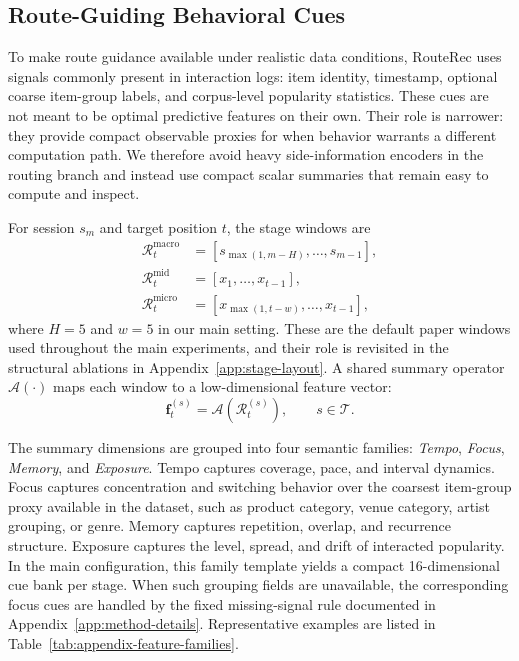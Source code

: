 \documentclass[sigconf,review,anonymous]{acmart}
\begin{document}
\subsection{Route-Guiding Behavioral Cues}
\label{sec:feature-construction}

To make route guidance available under realistic data conditions, RouteRec uses signals commonly present in interaction logs: item identity, timestamp, optional coarse item-group labels, and corpus-level popularity statistics. These cues are not meant to be optimal predictive features on their own. Their role is narrower: they provide compact observable proxies for when behavior warrants a different computation path. We therefore avoid heavy side-information encoders in the routing branch and instead use compact scalar summaries that remain easy to compute and inspect.

For session $s_m$ and target position $t$, the stage windows are
\begin{align}
\mathcal{R}^{\mathrm{macro}}_t &= [s_{\max(1,m-H)},\dots,s_{m-1}], \\
\mathcal{R}^{\mathrm{mid}}_t &= [x_1,\dots,x_{t-1}], \\
\mathcal{R}^{\mathrm{micro}}_t &= [x_{\max(1,t-w)},\dots,x_{t-1}],
\end{align}
where $H=5$ and $w=5$ in our main setting. These are the default paper windows used throughout the main experiments, and their role is revisited in the structural ablations in Appendix~\ref{app:stage-layout}. A shared summary operator $\mathcal{A}(\cdot)$ maps each window to a low-dimensional feature vector:
\[
\mathbf{f}^{(s)}_t=\mathcal{A}(\mathcal{R}^{(s)}_t),\qquad s\in\mathcal{T}.
\]

The summary dimensions are grouped into four semantic families: \textit{Tempo}, \textit{Focus}, \textit{Memory}, and \textit{Exposure}. Tempo captures coverage, pace, and interval dynamics. Focus captures concentration and switching behavior over the coarsest item-group proxy available in the dataset, such as product category, venue category, artist grouping, or genre. Memory captures repetition, overlap, and recurrence structure. Exposure captures the level, spread, and drift of interacted popularity. In the main configuration, this family template yields a compact 16-dimensional cue bank per stage. When such grouping fields are unavailable, the corresponding focus cues are handled by the fixed missing-signal rule documented in Appendix~\ref{app:method-details}. Representative examples are listed in Table~\ref{tab:appendix-feature-families}.
\end{document}
